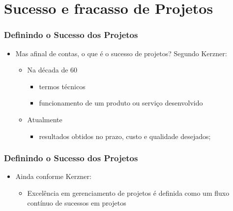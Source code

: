 \section{Sucesso e fracasso de Projetos}



\begin{frame}
   \frametitle{Definindo o Sucesso dos Projetos}
   \begin{itemize}
    \item Mas afinal de contas, o que é o sucesso de projetos? Segundo Kerzner:
    \begin{itemize}
     \item Na década de 60
     \begin{itemize}
      \item termos técnicos
      \item funcionamento de um produto ou serviço desenvolvido
     \end{itemize}
    \item Atualmente
    \begin{itemize}
     \item resultados obtidos no prazo, custo e qualidade desejados;
    \end{itemize}
    \end{itemize}
   \end{itemize}
  \end{frame}
  
   \begin{frame}
   \frametitle{Definindo o Sucesso dos Projetos}
   \begin{itemize}
    \item Ainda conforme Kerzner:
    \begin{itemize}
     \item Excelência em gerenciamento de projetos é definida como um fluxo contínuo de sucessos em projetos
    \end{itemize}
   \end{itemize}
  \end{frame}
  
